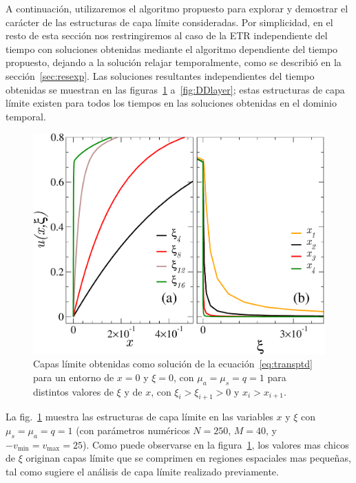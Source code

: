 A continuación, utilizaremos el algoritmo propuesto para 
explorar y demostrar el carácter de las estructuras de capa límite 
consideradas. Por simplicidad, en el resto de esta sección nos restringiremos 
al caso de la ETR independiente del tiempo con soluciones 
obtenidas mediante el algoritmo dependiente del tiempo propuesto, 
dejando a la solución relajar temporalmente, como se describió 
en la sección~\ref{sec:resexp}. Las soluciones resultantes independientes del 
tiempo obtenidas se muestran en las figuras~\ref{fig:blayers1} 
a~\ref{fig:DDlayer}; estas estructuras de capa límite 
existen para todos los tiempos en las soluciones obtenidas 
en el dominio temporal. 

\begin{figure}[h!]
\centering
  \includegraphics[width=0.5\linewidth]{figuras/xilay.pdf}
  \caption{Capas límite obtenidas como solución 
  de la ecuación~\eqref{eq:transptd} para un entorno de $x=0$ y $\xi=0$, 
  con $\mu_a=\mu_s=q=1$ para distintos valores de $\xi$ y de $x$, 
  con $\xi_i>\xi_{i+1}>0$ y $x_i>x_{i+1}$.}
 \label{fig:blayers1}
\end{figure}
La fig.~\ref{fig:blayers1} muestra las estructuras de capa límite en las 
variables $x$ y $\xi$ con $\mu_s=\mu_a=q=1$ (con parámetros numéricos $N=250$, $M=40$, 
y $-v_{\text{min}}=v_{\text{max}}=25$). Como puede observarse 
en la figura~\ref{fig:blayers1}, los valores mas chicos de $\xi$ 
originan capas límite que se comprimen en regiones espaciales mas 
pequeñas, tal como sugiere el análisis de capa límite realizado 
previamente. 

